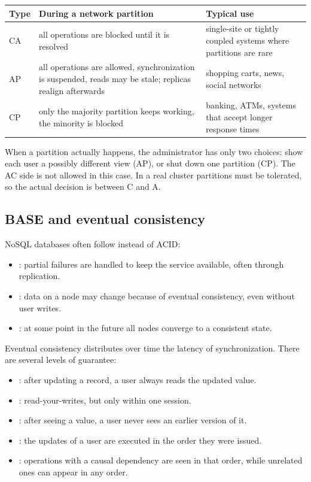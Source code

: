 \begin{table}[h]
\centering\small
\begin{tabular}{p{1cm}p{5.7cm}p{6.2cm}}
\toprule
\textbf{Type} & \textbf{During a network partition} & \textbf{Typical use} \\
\midrule
CA & all operations are blocked until it is resolved & single-site or tightly coupled systems where partitions are rare \\
AP & all operations are allowed, synchronization is suspended, reads may be stale; replicas realign afterwards & shopping carts, news, social networks \\
CP & only the majority partition keeps working, the minority is blocked & banking, ATMs, systems that accept longer response times \\
\bottomrule
\end{tabular}
\end{table}

\begin{remark}
When a partition actually happens, the administrator has only two choices: show each user a possibly different view (AP), or shut down one partition (CP). The AC side is not allowed in this case. In a real cluster partitions must be tolerated, so the actual decision is between C and A.
\end{remark}

\subsection{BASE and eventual consistency}
NoSQL databases often follow  instead of ACID:
\begin{itemize}
  \item {}: partial failures are handled to keep the service available, often through replication.
  \item {}: data on a node may change because of eventual consistency, even without user writes.
  \item {}: at some point in the future all nodes converge to a consistent state.
\end{itemize}

Eventual consistency distributes over time the latency of synchronization. There are several levels of guarantee:
\begin{itemize}
  \item {}: after updating a record, a user always reads the updated value.
  \item {}: read-your-writes, but only within one session.
  \item {}: after seeing a value, a user never sees an earlier version of it.
  \item {}: the updates of a user are executed in the order they were issued.
  \item {}: operations with a causal dependency are seen in that order, while unrelated ones can appear in any order.
\end{itemize}

